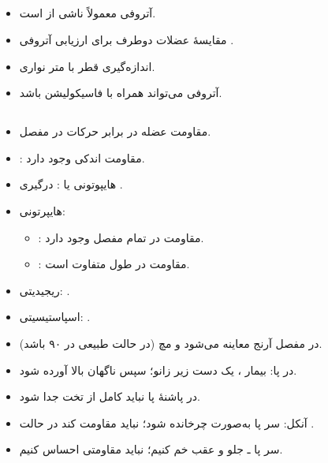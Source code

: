 \documentclass[a4paper,12pt]{extbook}
\begin{document}
\subsection*{}
\begin{itemize}
\item آتروفی معمولاً ناشی از  است.
\item مقایسهٔ عضلات دوطرف برای ارزیابی آتروفی .
\item اندازه‌گیری قطر با متر نواری.
\item آتروفی می‌تواند همراه با فاسیکولیشن باشد.
\end{itemize}
\subsection*{}
\begin{itemize}
\item مقاومت عضله در برابر حرکات  در مفصل.
\item {}: مقاومت اندکی وجود دارد.
\item هایپوتونی یا : درگیری .
\item هایپرتونی:
  \begin{itemize}
  \item {}: مقاومت در تمام  مفصل وجود دارد.
  \item {}: مقاومت در طول  متفاوت است.
  \end{itemize}
\item ریجیدیتی: .
\item اسپاستیسیتی: .
\item در مفصل آرنج معاینه می‌شود و مچ (در حالت طبیعی در ۹۰ باشد).
\item در پا: بیمار ، یک دست زیر زانو؛ سپس ناگهان بالا آورده شود.
\item در  پاشنهٔ پا نباید کامل از تخت جدا شود.
\item آنکل: سر پا به‌صورت  چرخانده شود؛ نباید مقاومت کند در حالت .
\item سر پا ـ جلو و عقب خم کنیم؛ نباید مقاومتی احساس کنیم.
\end{itemize}

\end{document}
